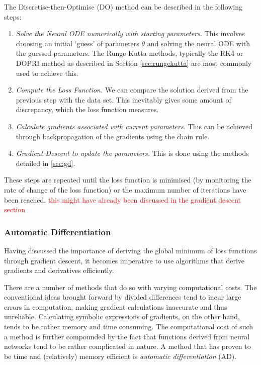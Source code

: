 \documentclass[a4paper,11pt,titlepage]{article}
\theoremstyle{definition}
\theoremstyle{plain}
\theoremstyle{remark}
\begin{document}
The Discretise-then-Optimise (DO) method can be described in the following steps:
\begin{enumerate}
    \item \textit{Solve the Neural ODE numerically with starting parameters.} This involves choosing an initial ‘guess’ of parameters $\theta$ and solving the neural ODE with the guessed parameters. The Runge-Kutta methods, typically the RK4 or DOPRI method as described in Section \ref{sec:rungekutta} are most commonly used to achieve this.
    \item \textit{Compute the Loss Function.} We can compare the solution derived from the previous step with the data set. This inevitably gives some amount of discrepancy, which the loss function measures.
    \item \textit{Calculate gradients associated with current parameters.} This can be achieved through backpropagation of the gradients using the chain rule. 
    \item \textit{Gradient Descent to update the parameters.} This is done using the methods detailed in \ref{sec:gd}.
\end{enumerate}

These steps are repeated until the loss function is minimised (by monitoring the rate of change of the loss function) or the maximum number of iterations have been reached. \textcolor{red}{this might have already been discussed in the gradient descent section}

\subsubsection{Automatic Differentiation}
\label{sec:ad}

Having discussed the importance of deriving the global minimum of loss functions through gradient descent, it becomes imperative to use algorithms that derive gradients and derivatives efficiently. 

There are a number of methods that do so with varying computational costs. The conventional ideas brought forward by divided differences tend to incur large errors in computation, making gradient calculations inaccurate and thus unreliable. Calculating symbolic expressions of gradients, on the other hand, tends to be rather memory and time consuming. The computational cost of such a method is further compounded by the fact that functions derived from neural networks tend to be rather complicated in nature. A method that has proven to be time and (relatively) memory efficient is \textit{automatic differentiation} (AD). 
\end{document}
